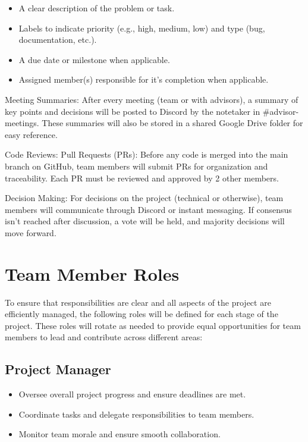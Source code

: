 \documentclass{article}
\begin{document}
\begin{itemize}
    \item A clear description of the problem or task.
    \item Labels to indicate priority (e.g., high, medium, low) and type (bug, documentation, etc.).
    \item A due date or milestone when applicable.
    \item Assigned member(s) responsible for it's completion when applicable.
\end{itemize}

\begin{flushleft}
  Meeting Summaries:
  After every meeting (team or with advisors), a summary of key points and decisions will be posted to Discord by the notetaker in \#advisor-meetings. These summaries will also be stored in a shared Google Drive folder for easy reference.\par

  Code Reviews:
  Pull Requests (PRs): Before any code is merged into the main branch on GitHub, team members will submit PRs for organization and traceability. Each PR must be reviewed and approved by 2 other members.\par

  Decision Making:
  For decisions on the project (technical or otherwise), team members will communicate through Discord or instant messaging. If consensus isn’t reached after discussion, a vote will be held, and majority decisions will move forward.\par
\end{flushleft}


\section{Team Member Roles}

To ensure that responsibilities are clear and all aspects of the project are efficiently managed, the following roles will be defined for each stage of the project. These roles will rotate as needed to provide equal opportunities for team members to lead and contribute across different areas:

\subsection{Project Manager} 
  \begin{itemize}
    \item Oversee overall project progress and ensure deadlines are met.
    \item Coordinate tasks and delegate responsibilities to team members.
    \item Monitor team morale and ensure smooth collaboration.
  \end{itemize}
\end{document}
